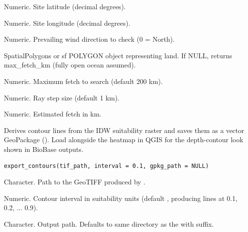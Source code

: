 \documentclass[a4paper]{book}
\begin{document}
%
\begin{Arguments}
\begin{ldescription}
\item[\code{lat}] Numeric. Site latitude (decimal degrees).

\item[\code{lon}] Numeric. Site longitude (decimal degrees).

\item[\code{bearing\_deg}] Numeric. Prevailing wind direction to check (0 = North).

\item[\code{land\_polygons}] SpatialPolygons or sf POLYGON object representing
land. If NULL, returns max\_fetch\_km (fully open ocean assumed).

\item[\code{max\_fetch\_km}] Numeric. Maximum fetch to search (default 200 km).

\item[\code{step\_km}] Numeric. Ray step size (default 1 km).
\end{ldescription}
\end{Arguments}
%
\begin{Value}
Numeric. Estimated fetch in km.
\end{Value}
%
\begin{Description}
Derives contour lines from the IDW suitability raster and saves them as a
vector GeoPackage (). Load alongside the heatmap in QGIS for the
depth-contour look shown in BioBase outputs.
\end{Description}
%
\begin{Usage}
\begin{verbatim}
export_contours(tif_path, interval = 0.1, gpkg_path = NULL)
\end{verbatim}
\end{Usage}
%
\begin{Arguments}
\begin{ldescription}
\item[\code{tif\_path}] Character. Path to the GeoTIFF produced by .

\item[\code{interval}] Numeric. Contour interval in suitability units (default ,
producing lines at 0.1, 0.2, ... 0.9).

\item[\code{gpkg\_path}] Character. Output  path. Defaults to same directory
as the  with  suffix.
\end{ldescription}
\end{Arguments}
\end{document}

